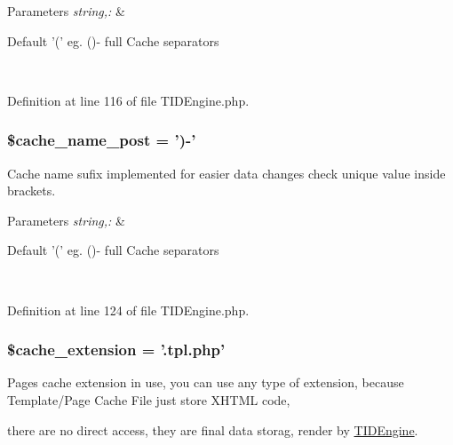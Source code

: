 \begin{DoxyParams}{Parameters}
{\em string,:} & 
\begin{DoxyItemize}
\item Default '(' eg. ()-\/ full Cache separators 
\end{DoxyItemize}\\
\hline
\end{DoxyParams}


Definition at line 116 of file TIDEngine.php.

\hypertarget{group__general__cache__settings_ga0b2dfab31e245d074c86967134122b25}{
\subsubsection[{\$cache\_\-name\_\-post}]{\setlength{\rightskip}{0pt plus 5cm}\$cache\_\-name\_\-post = ')-\/'}}
\label{group__general__cache__settings_ga0b2dfab31e245d074c86967134122b25}
Cache name sufix implemented for easier data changes check unique value inside brackets.


\begin{DoxyParams}{Parameters}
{\em string,:} & 
\begin{DoxyItemize}
\item Default '(' eg. ()-\/ full Cache separators 
\end{DoxyItemize}\\
\hline
\end{DoxyParams}


Definition at line 124 of file TIDEngine.php.

\hypertarget{group__general__cache__settings_gac1516832f9aecd303dcb275d08e97efe}{
\subsubsection[{\$cache\_\-extension}]{\setlength{\rightskip}{0pt plus 5cm}\$cache\_\-extension = '.tpl.php'}}
\label{group__general__cache__settings_gac1516832f9aecd303dcb275d08e97efe}
Pages cache extension in use, you can use any type of extension, because Template/Page Cache File just store XHTML code,\par
 there are no direct access, they are final data storag, render by \hyperlink{class_t_i_d_engine}{TIDEngine}.


